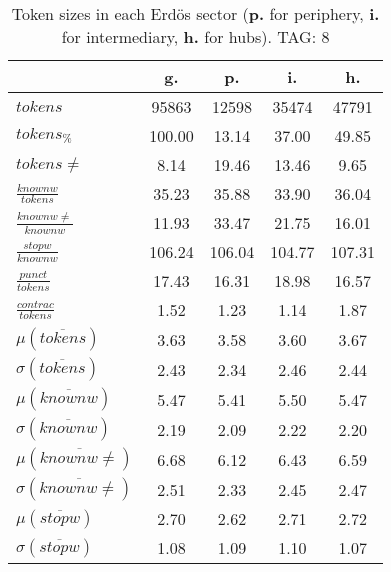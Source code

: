 \begin{table}[h!]
\begin{center}
\begin{tabular}{| l || c | c | c | c |}\hline
 & {\bf g.} & {\bf p.} & {\bf i.} & {\bf h.} \\\hline\hline
$tokens$ & 95863  & 12598  & 35474  & 47791 \\
$tokens_{\%}$ & 100.00  & 13.14  & 37.00  & 49.85 \\
$tokens \neq$ & 8.14  & 19.46  & 13.46  & 9.65 \\\hline
$\frac{knownw}{tokens}$ & 35.23  & 35.88  & 33.90  & 36.04 \\
$\frac{knownw \neq}{knownw}$ & 11.93  & 33.47  & 21.75  & 16.01 \\\hline
$\frac{stopw}{knownw}$ & 106.24  & 106.04  & 104.77  & 107.31 \\
$\frac{punct}{tokens}$ & 17.43  & 16.31  & 18.98  & 16.57 \\
$\frac{contrac}{tokens}$ & 1.52  & 1.23  & 1.14  & 1.87 \\\hline\hline
$\mu(\overline{tokens})$ & 3.63  & 3.58  & 3.60  & 3.67 \\
$\sigma(\overline{tokens})$ & 2.43  & 2.34  & 2.46  & 2.44 \\\hline
$\mu(\overline{knownw})$ & 5.47  & 5.41  & 5.50  & 5.47 \\
$\sigma(\overline{knownw})$ & 2.19  & 2.09  & 2.22  & 2.20 \\\hline
$\mu(\overline{knownw \neq})$ & 6.68  & 6.12  & 6.43  & 6.59 \\
$\sigma(\overline{knownw \neq})$ & 2.51  & 2.33  & 2.45  & 2.47 \\\hline
$\mu(\overline{stopw})$ & 2.70  & 2.62  & 2.71  & 2.72 \\
$\sigma(\overline{stopw})$ & 1.08  & 1.09  & 1.10  & 1.07 \\\hline
\end{tabular}
\caption{Token sizes in each Erd\"os sector ({{\bf p.}} for periphery, {{\bf i.}} for intermediary, {{\bf h.}} for hubs). TAG: 8}
\end{center}
\end{table}